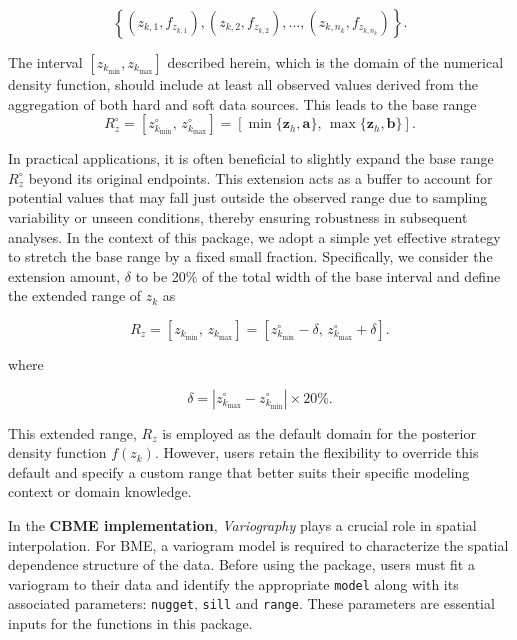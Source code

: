 \vspace{-1em}

\begin{equation}
\left\{ ( z_{k,1}, f_{z_{k,1}} ), ( z_{k,2}, f_{z_{k,2}} ), \dots, ( z_{k,n_k}, f_{z_{k,n_k}} ) \right\}
\label{eq:paired}.
\end{equation}

The interval \([z_{k_{\min}}, z_{k_{\max}}]\) described herein, which is the domain of the numerical density function, should include at least all observed values derived from the aggregation of both hard and soft data sources. This leads to the base range
\[
R^{\circ}_z=[z^{\circ}_{k_{\min}}, \, z^{\circ}_{k_{\max}}] = 
\left[\min\{\boldsymbol{z}_h, \boldsymbol{a}\}, \, \max\{\boldsymbol{z}_h, \boldsymbol{b}\}\right].
\]

In practical applications, it is often beneficial to slightly expand the base range \(R^{\circ}_z\) beyond its original endpoints. This extension acts as a buffer to account for potential values that may fall just outside the observed range due to sampling variability or unseen conditions, thereby ensuring robustness in subsequent analyses. In the context of this package, we adopt a simple yet effective strategy to stretch the base range by a fixed small fraction. Specifically, we consider the extension amount, \(\delta\) to be 20\% of the total width of the base interval and define the extended range of \(z_k\) as

\vspace{-1em}

\begin{equation}
R_z = [z_{k_{\min}},\, z_{k_{\max}}] = 
  \left[z^{\circ}_{k_{\min}} - \delta,\, z^{\circ}_{k_{\max}} + \delta\right]
\label{eq:zk-range}.
\end{equation}

where

\vspace{-1em}

\begin{equation}
\delta = \left|z^{\circ}_{k_{\max}} - z^{\circ}_{k_{\min}}\right| \times 20\%
\label{eq:delta}.
\end{equation}

This extended range, \(R_z\) is employed as the default domain for the posterior density function \(f(z_k)\). However, users retain the flexibility to override this default and specify a custom range that better suits their specific modeling context or domain knowledge.

In the \textbf{CBME implementation}, \emph{Variography} plays a crucial role in spatial interpolation. For BME, a variogram model is required to characterize the spatial dependence structure of the data. Before using the  package, users must fit a variogram to their data and identify the appropriate \texttt{model} along with its associated parameters: \texttt{nugget}, \texttt{sill} and \texttt{range}. These parameters are essential inputs for the functions in this package.

